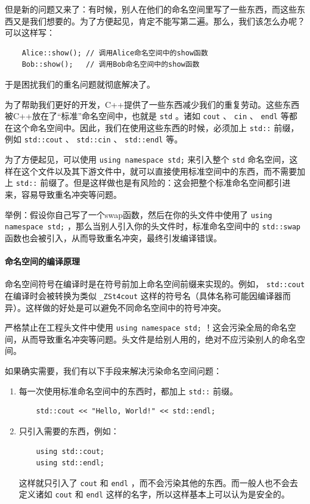 但是新的问题又来了：有时候，别人在他们的命名空间里写了一些东西，而这些东西又是我们想要的。为了方便起见，肯定不能写第二遍。那么，我们该怎么办呢？可以这样写：
\begin{verbatim}
    Alice::show(); // 调用Alice命名空间中的show函数
    Bob::show();   // 调用Bob命名空间中的show函数
\end{verbatim}
于是困扰我们的重名问题就彻底解决了。

为了帮助我们更好的开发，C++提供了一些东西减少我们的重复劳动。这些东西被C++放在了“标准”命名空间中，也就是 \texttt{std} 。诸如 \texttt{cout} 、 \texttt{cin} 、 \texttt{endl} 等都在这个命名空间中。因此，我们在使用这些东西的时候，必须加上 \texttt{std::} 前缀，例如 \texttt{std::cout} 、 \texttt{std::cin} 、 \texttt{std::endl} 等。

为了方便起见，可以使用 \texttt{using namespace std;} 来引入整个 \texttt{std} 命名空间，这样在这个文件以及其下游文件中，就可以直接使用标准空间中的东西，而不需要加上 \texttt{std::} 前缀了。但是这样做也是有风险的：这会把整个标准命名空间都引进来，容易导致重名冲突等问题。

举例：假设你自己写了一个swap函数，然后在你的头文件中使用了 \texttt{using namespace std;} ，那么当别人引入你的头文件时，标准命名空间中的 \texttt{std::swap} 函数也会被引入，从而导致重名冲突，最终引发编译错误。

\paragraph{命名空间的编译原理}

命名空间符号在编译时是在符号前加上命名空间前缀来实现的。例如， \texttt{std::cout} 在编译时会被转换为类似 \texttt{\_ZSt4cout} 这样的符号名（具体名称可能因编译器而异）。这样做的好处是可以避免不同命名空间中的符号冲突。

\begin{warning}
  严格禁止在工程头文件中使用 \texttt{using namespace std;} ！这会污染全局的命名空间，从而导致重名冲突等问题。头文件是给别人用的，绝对不应污染别人的命名空间。
  
  如果确实需要，我们有以下手段来解决污染命名空间问题：

  \begin{enumerate}
    \item 每一次使用标准命名空间中的东西时，都加上 \texttt{std::} 前缀。
        \begin{verbatim}
    std::cout << "Hello, World!" << std::endl;
        \end{verbatim}
    \item 只引入需要的东西，例如：
        \begin{verbatim}
    using std::cout;
    using std::endl;
        \end{verbatim}
      这样就只引入了 \texttt{cout} 和 \texttt{endl} ，而不会污染其他的东西。而一般人也不会去定义诸如 \texttt{cout} 和 \texttt{endl} 这样的名字，所以这样基本上可以认为是安全的。
  \end{enumerate}
\end{warning}

